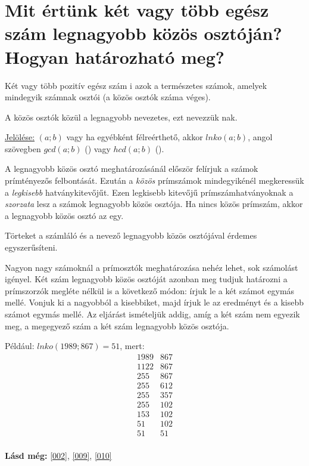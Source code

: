 
\section{Mit értünk két vagy több egész szám legnagyobb közös osztóján?
\texorpdfstring{\\}{}Hogyan határozható meg?}
\label{001}

\begin{defin}
Két vagy több pozitív egész szám i azok a természetes
számok, amelyek mindegyik számnak osztói (a közös osztók száma véges).
\end{defin}

\begin{defin}
A közös osztók közül a legnagyobb nevezetes, ezt nevezzük nak.

\uline{Jelölése:} $(a; b)$ vagy ha egyébként félreérthető, akkor $lnko(a; b)$,
angol szövegben $gcd(a; b)$ () vagy $hcd(a;
b)$ ().
\end{defin}

\begin{method}
A legnagyobb közös osztó meghatározásánál először felírjuk a számok
prímtényezős felbontását. Ezután a \emph{közös} prímszámok mindegyikénél
megkeressük a \emph{legkisebb} hatványkitevőjűt. Ezen legkisebb kitevőjű
prímszámhatványoknak a \emph{szorzata} lesz a számok legnagyobb közös osztója.
Ha nincs közös prímszám, akkor a legnagyobb közös osztó az egy.
\end{method}

\begin{note2}
Törteket a számláló és a nevező legnagyobb közös osztójával érdemes
egyszerűsíteni.
\end{note2}

\begin{method4}
Nagyon nagy számoknál a prímosztók meghatározása nehéz lehet, sok számolást
igényel. Két szám legnagyobb közös osztóját azonban meg tudjuk határozni a
prímszorzók megléte nélkül is a következő módon: írjuk le a két számot egymás
mellé. Vonjuk ki a nagyobból a kisebbiket, majd írjuk le az eredményt és a
kisebb számot egymás mellé. Az eljárást ismételjük addig, amíg a két szám nem
egyezik meg, a megegyező szám a két szám legnagyobb közös osztója.

Például: $lnko(1989; 867) = 51$, mert:
\[
\begin{array}{r|l}
  1989 & 867 \\
  1122 & 867 \\
  255 & 867 \\
  255 & 612 \\
  255 & 357 \\
  255 & 102 \\
  153 & 102 \\
  51 & 102 \\
  51 & 51 \\
\end{array}
\]
\end{method4}

\textbf{Lásd még:} \ref{002}, \ref{009}, \ref{010}
